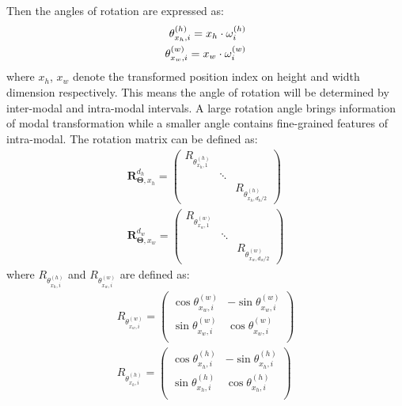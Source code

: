 Then the angles of rotation are expressed as:
\begin{equation}
\setlength{\abovedisplayskip}{1pt}
\setlength{\belowdisplayskip}{1pt}
\begin{aligned}
\theta_{x_h,i}^{(h)}=x_h\cdot\omega_i^{(h)}\\
\theta_{x_w,i}^{(w)}=x_w\cdot\omega_i^{(w)}
\end{aligned}
\end{equation}
where $x_h$, $x_w$ denote the transformed position index on height and width dimension respectively.
This means the angle of rotation will be determined by inter-modal and intra-modal intervals. A large rotation angle brings information of modal transformation while a smaller angle contains fine-grained features of intra-modal.
The rotation matrix can be defined as:
\begin{equation}
\begin{aligned}
    \boldsymbol{R}_{\boldsymbol{\Theta},x_h}^{d_h}=\begin{pmatrix}R_{\theta_{x_h,1}^{(h)}} &  &   \\  & \ddots &   \\    &  & R_{\theta_{x_h,d_h/2}^{(h)}} \end{pmatrix}\\
     \boldsymbol{R}_{\boldsymbol{\Theta},x_w}^{d_w}=\begin{pmatrix}R_{\theta_{x_w,1}^{(w)}} &  &   \\  & \ddots &   \\    &  & R_{\theta_{x_w,d_w/2}^{(w)}} \end{pmatrix}
\end{aligned}
\end{equation}
where $R_{\theta_{x_h,i}^{(h)}}$ and $R_{\theta_{x_w,i}^{(w)}}$ are defined as:
\begin{equation}
\begin{aligned}
R_{\theta_{x_w,i}^{(w)}}=\begin{pmatrix}
{\operatorname{cos}\theta_{x_w,i}^{(w)}} & {-\operatorname{sin}\theta_{x_w,i}^{(w)}} \\
{\operatorname{sin}\theta_{x_w,i}^{(w)}} & {\operatorname{cos}\theta_{x_w,i}^{(w)}} \\
\end{pmatrix}
\\
R_{\theta_{x_h,i}^{(h)}}=\begin{pmatrix}
{\operatorname{cos}\theta_{x_h,i}^{(h)}} & {-\operatorname{sin}\theta_{x_h,i}^{(h)}} \\
{\operatorname{sin}\theta_{x_h,i}^{(h)}} & {\operatorname{cos}\theta_{x_h,i}^{(h)}} \\
\end{pmatrix}
\end{aligned}
\end{equation}

